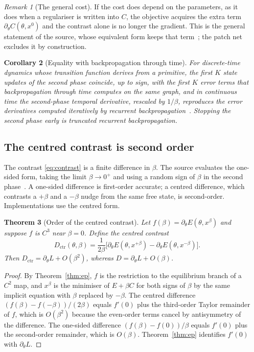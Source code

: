 \documentclass[11pt]{article}
\newtheorem{theorem}{Theorem}
\newtheorem{corollary}[theorem]{Corollary}
\theoremstyle{definition}
\theoremstyle{remark}
\newtheorem{remark}[theorem]{Remark}
\begin{document}
\begin{remark}[The general cost]
If the cost does depend on the parameters, as it does when a regulariser is written into $C$, the
objective acquires the extra term $\partial_\theta C(\theta,x^0)$ and the contrast alone is no longer
the gradient. This is the general statement of the source, whose equivalent form keeps that
term~\cite{scellier2017}; the patch net excludes it by construction.
\end{remark}

\begin{corollary}[Equality with backpropagation through time]
For discrete-time dynamics whose transition function derives from a primitive, the first $K$ state
updates of the second phase coincide, up to sign, with the first $K$ error terms that backpropagation
through time computes on the same graph, and in
continuous time the second-phase temporal derivative, rescaled by $1/\beta$, reproduces the error
derivatives computed iteratively by recurrent backpropagation~\cite{scellier2019,ernoult2019}. Stopping
the second phase early is truncated recurrent backpropagation.
\end{corollary}

\subsection{The centred contrast is second order}
\label{sec:centred}
The contrast \eqref{eq:contrast} is a finite difference in $\beta$. The source evaluates the one-sided
form, taking the limit $\beta\to0^{+}$ and using a random sign of $\beta$ in the second
phase~\cite{scellier2017}. A one-sided difference is first-order
accurate; a centred difference, which contrasts a $+\beta$ and a $-\beta$ nudge from the same free
state, is second-order. Implementations use the centred form.

\begin{theorem}[Order of the centred contrast]
\label{thm:centred}
Let $f(\beta)=\partial_\theta E(\theta,x^\beta)$ and suppose $f$ is $C^3$ near $\beta=0$. Define the
centred contrast
\begin{equation}
D_{\text{ctr}}(\theta,\beta)=\frac{1}{2\beta}\Big[\partial_\theta E(\theta,x^{+\beta})-\partial_\theta E(\theta,x^{-\beta})\Big].
\label{eq:centred}
\end{equation}
Then $D_{\text{ctr}}=\partial_\theta L+O(\beta^2)$, whereas $D=\partial_\theta L+O(\beta)$.
\end{theorem}
\begin{proof}
By Theorem~\ref{thm:ep}, $f$ is the restriction to the equilibrium branch of a $C^2$ map, and $x^\beta$
is the minimiser of $E+\beta C$ for both signs of $\beta$ by the same implicit equation with $\beta$
replaced by $-\beta$. The centred difference $(f(\beta)-f(-\beta))/(2\beta)$ equals $f'(0)$ plus the
third-order Taylor remainder of $f$, which is $O(\beta^2)$ because the even-order terms cancel by
antisymmetry of the difference. The one-sided difference $(f(\beta)-f(0))/\beta$ equals $f'(0)$ plus
the second-order remainder, which is $O(\beta)$. Theorem~\ref{thm:ep} identifies $f'(0)$ with
$\partial_\theta L$.
\end{proof}
\end{document}
